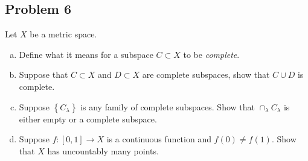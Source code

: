 \documentclass[12pt]{article}
\newcommand{\ita}[1]{\textit{#1}}
\newcommand\setb[1]{\left \{ #1 \right \}}
\theoremstyle{definition}
\begin{document}
\subsection{Problem 6 \texorpdfstring{\cite{Berge}}{}}
Let $X$ be a metric space.
\begin{enumerate}[(a)]
    \item Define what it means for a subspace $C \subset X$ to be \ita{complete}.
    \item Suppose that $C \subset X$ and $D \subset X$ are complete subspaces, show that $C \cup D$ is complete.
    \item Suppose $\setb{ C_{\lambda} }$ is any family of complete subspaces. Show that $\cap_{\lambda} C_{\lambda}$ is either empty or a complete subspace.
    \item Suppose $f : [0,1] \to X$ is a continuous function and $f(0) \neq f(1)$. Show that $X$ has uncountably many points.
\end{enumerate}
\end{document}
